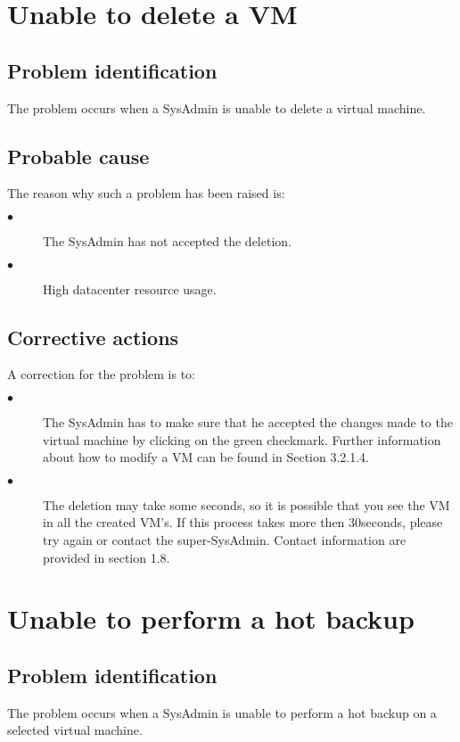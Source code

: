 \section{Unable to delete a VM}

\subsection{Problem identification}
The problem occurs when a SysAdmin is unable to delete a virtual
machine.

\subsection{Probable cause}

The reason why such a problem has been raised is:\\
\begin{description}
  \item[$\bullet$] The SysAdmin has not accepted the deletion.
  \item[$\bullet$] High datacenter resource usage.
\end{description}


\subsection{Corrective actions}

A correction for the problem is to:\\
\begin{description}
  \item[$\bullet$] The SysAdmin has to make sure that he accepted the changes made
to the virtual machine by clicking on the green checkmark. Further information about
how to modify a VM can be found in Section 3.2.1.4.
  \item[$\bullet$] The deletion may take some seconds, so it is possible that you see
the VM in all the created VM's. If this process takes more then 30seconds, please try
again or contact the super-SysAdmin. Contact information are provided in section 1.8.
\end{description}






\section{Unable to perform a hot backup}

\subsection{Problem identification}
The problem occurs when a SysAdmin is unable to perform a hot
backup on a selected virtual machine.

